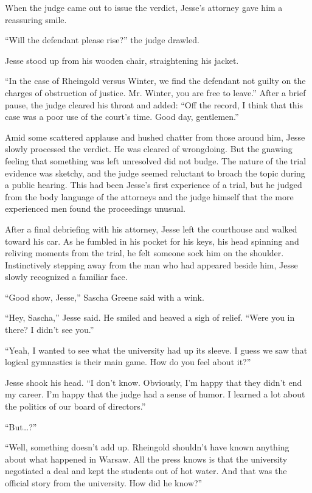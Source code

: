 \documentclass[12pt]{book}
\begin{document}
When the judge came out to issue the verdict, Jesse's attorney gave him a reassuring smile.

``Will the defendant please rise?'' the judge drawled.

Jesse stood up from his wooden chair, straightening his jacket.

``In the case of Rheingold versus Winter, we find the defendant not guilty on the charges of obstruction of justice.  Mr. Winter, you are free to leave.''  After a brief pause, the judge cleared his throat and added: ``Off the record, I think that this case was a poor use of the court's time.  Good day, gentlemen.''

Amid some scattered applause and hushed chatter from those around him, Jesse slowly processed the verdict.  He was cleared of wrongdoing.  But the gnawing feeling that something was left unresolved did not budge.  The nature of the trial evidence was sketchy, and the judge seemed reluctant to broach the topic during a public hearing.  This had been Jesse's first experience of a trial, but he judged from the body language of the attorneys and the judge himself that the more experienced men found the proceedings unusual.

After a final debriefing with his attorney, Jesse left the courthouse and walked toward his car.  As he fumbled in his pocket for his keys, his head spinning and reliving moments from the trial, he felt someone sock him on the shoulder.  Instinctively stepping away from the man who had appeared beside him, Jesse slowly recognized a familiar face.

``Good show, Jesse,'' Sascha Greene said with a wink.

``Hey, Sascha,''  Jesse said.  He smiled and heaved a sigh of relief.  ``Were you in there?  I didn't see you.''

``Yeah, I wanted to see what the university had up its sleeve.  I guess we saw that logical gymnastics is their main game.  How do you feel about it?''

Jesse shook his head.  ``I don't know.  Obviously, I'm happy that they didn't end my career.  I'm happy that the judge had a sense of humor.  I learned a lot about the politics of our board of directors.''

``But\dots?''

``Well, something doesn't add up.  Rheingold shouldn't have known anything about what happened in Warsaw.  All the press knows is that the university negotiated a deal and kept the students out of hot water.  And that was the official story from the university.  How did he know?''
\end{document}
